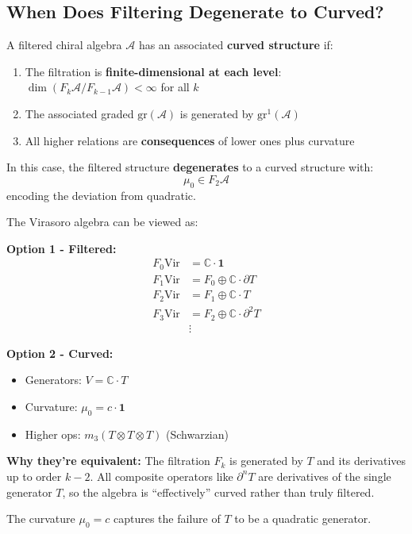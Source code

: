 
\subsection{When Does Filtering Degenerate to Curved?}

\begin{proposition}\label{prop:filtered-to-curved}
A filtered chiral algebra $\mathcal{A}$ has an associated \textbf{curved structure} if:
\begin{enumerate}
\item The filtration is \textbf{finite-dimensional at each level}: 
$\dim(F_k\mathcal{A}/F_{k-1}\mathcal{A}) < \infty$ for all $k$
\item The associated graded $\text{gr}(\mathcal{A})$ is generated by $\text{gr}^1(\mathcal{A})$
\item All higher relations are \textbf{consequences} of lower ones plus curvature
\end{enumerate}

In this case, the filtered structure \textbf{degenerates} to a curved structure with:
$$\mu_0 \in F_2\mathcal{A}$$
encoding the deviation from quadratic.
\end{proposition}

\begin{example}\label{ex:vir-filtered-to-curved}
The Virasoro algebra can be viewed as:

\textbf{Option 1 - Filtered:}
\begin{align}
F_0\text{Vir} &= \mathbb{C} \cdot \mathbf{1} \\
F_1\text{Vir} &= F_0 \oplus \mathbb{C} \cdot \partial T \\
F_2\text{Vir} &= F_1 \oplus \mathbb{C} \cdot T \\
F_3\text{Vir} &= F_2 \oplus \mathbb{C} \cdot \partial^2 T \\
&\vdots
\end{align}

\textbf{Option 2 - Curved:}
\begin{itemize}
\item Generators: $V = \mathbb{C} \cdot T$
\item Curvature: $\mu_0 = c \cdot \mathbf{1}$
\item Higher ops: $m_3(T \otimes T \otimes T)$ (Schwarzian)
\end{itemize}

\textbf{Why they're equivalent:}
The filtration $F_k$ is generated by $T$ and its derivatives up to order $k-2$. All composite 
operators like $\partial^n T$ are derivatives of the single generator $T$, so the algebra is 
``effectively'' curved rather than truly filtered.

The curvature $\mu_0 = c$ captures the failure of $T$ to be a quadratic generator.
\end{example}

